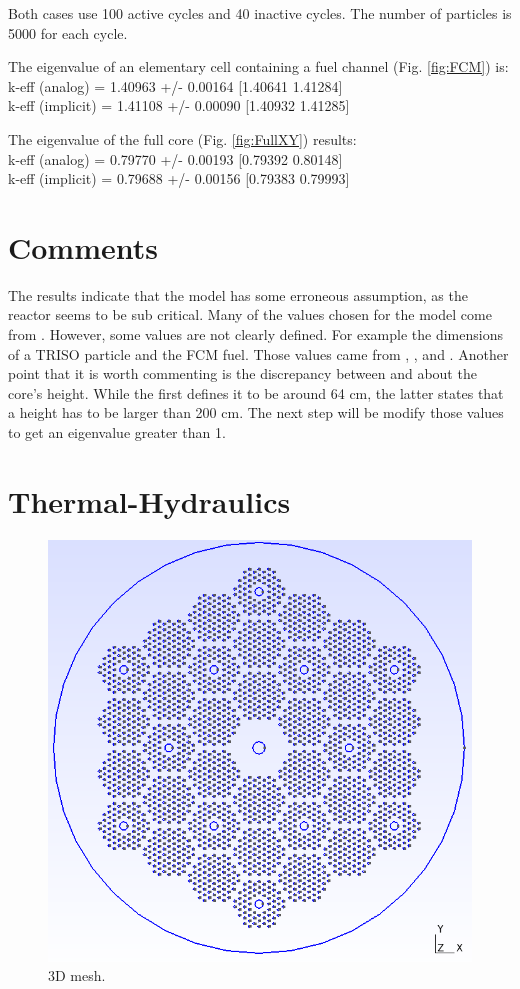 \documentclass[11pt,letterpaper]{article}
\begin{document}
Both cases use 100 active cycles and 40 inactive cycles. The number of particles is 5000 for each cycle.

The eigenvalue of an elementary cell containing a fuel channel (Fig. \ref{fig:FCM}) is: \\
\noindent
k-eff (analog)    = 1.40963 +/- 0.00164  [1.40641  1.41284]\\
\noindent
k-eff (implicit)  = 1.41108 +/- 0.00090  [1.40932  1.41285]

The eigenvalue of the full core (Fig. \ref{fig:FullXY}) results:\\
\noindent
k-eff (analog)    = 0.79770 +/- 0.00193  [0.79392  0.80148]\\
\noindent
k-eff (implicit)  = 0.79688 +/- 0.00156  [0.79383  0.79993]


\section{Comments}

The results indicate that the model has some erroneous assumption, as the reactor seems to be sub critical.
Many of the values chosen for the model come from \cite{hawari_development_2018}. However, some values are not clearly defined.
For example the dimensions of a TRISO particle and the FCM fuel. Those values came from \cite{powers_fully_2013}, \cite{jo_preliminary_2014}, and \cite{venneri_neutronic_2015}.
Another point that it is worth commenting is the discrepancy between \cite{hawari_development_2018} and \cite{jo_preliminary_2014} about the core's height. While the first defines it to be around 64 cm, the latter states that a height has to be larger than 200 cm.
The next step will be modify those values to get an eigenvalue greater than 1.

\section{Thermal-Hydraulics}

\begin{figure}[H]
	\centering
	\includegraphics[width=0.5\linewidth]{figures/MMR3D_full.png}
	\hfill
	\caption{3D mesh.}
	\label{fig:gmsh3D}
\end{figure}

\pagebreak


\end{document}
